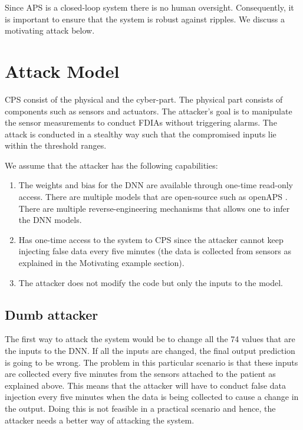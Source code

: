 Since APS is a closed-loop system there is no human oversight. Consequently, it is important to ensure that the system is robust against ripples. We discuss a motivating attack below. 


\section{Attack Model}
CPS consist of the physical and the cyber-part. The physical part consists of components such as sensors and actuators. The attacker's goal is to manipulate the sensor measurements to conduct FDIAs without triggering alarms. The attack is conducted in a stealthy way such that the compromised inputs lie within the threshold ranges. 

We assume that the attacker has the following capabilities:
\begin{enumerate}
	\item The weights and bias for the DNN are available through one-time read-only access. There are multiple models that are open-source such as openAPS \cite{openAPS}. There are multiple reverse-engineering mechanisms \cite{10.1145/3195970.3196105} that allows one to infer the DNN models.  
	\item Has one-time access to the system to CPS since the attacker cannot keep injecting false data every five minutes (the data is collected from sensors as explained in the Motivating example section).
	\item The attacker does not modify the code but only the inputs to the model.
\end{enumerate}

\subsection{Dumb attacker}
The first way to attack the system would be to change all the 74 values that are the inputs to the DNN. If all the inputs are changed, the final output prediction is going to be wrong. The problem in this particular scenario is that these inputs are collected every five minutes from the sensors attached to the patient as explained above. This means that the attacker will have to conduct false data injection every five minutes when the data is being collected to cause a change in the output. Doing this is not feasible in a practical scenario and hence, the attacker needs a better way of attacking the system. 

